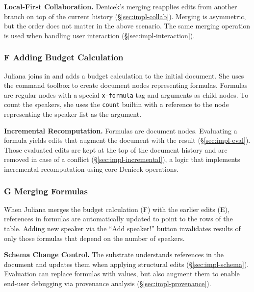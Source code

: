 \documentclass[sigconf]{acmart}
\newcommand{\diff}[1]{{#1}}
\newcommand{\note}[1]{}
\newcommand*\circled[1]
{{\normalfont \Large \textcircled{\footnotesize {#1}}}}
\DeclareRobustCommand{\keyideabox}[3]
{\vspace{\dimexpr\baselineskip\relax} \colorbox{gray!20}{
\parbox{\dimexpr\columnwidth-\marginparsep-10pt\relax}
{\small {#1} \textbf{#2.} #3}
}}
\begin{document}
\keyideabox{\faLightbulbO}{Local-First Collaboration}{Denicek's merging
reapplies edits from another branch on top of the current history (\S\ref{sec:impl-collab}).
Merging is asymmetric, but the order does not matter in the above scenario. The same merging
operation is used when handling user interaction (\S\ref{sec:impl-interaction}).}

\subsubsection*{\circled{F} Adding Budget Calculation} Juliana joins in and adds a budget calculation to
the initial document. \diff{She uses the command toolbox to create document nodes representing
formulas. Formulas are regular nodes with a special} {\small\texttt{x-formula}} \diff{tag and
arguments as child nodes. To count the speakers, she uses the} {\small\texttt{count}} \diff{builtin
with a reference to the node representing the speaker list as the argument.}\note{Modified to describe
representation of formulas.}

\keyideabox{\faLightbulbO}{Incremental Recomputation}{Formulas are document nodes.
Evaluating a formula yields edits that augment the document with the result
(\S\ref{sec:impl-eval}). Those evaluated edits are kept at the top of the document history and are
removed in case of a conflict (\S\ref{sec:impl-incremental}), a logic that implements
incremental recomputation using core Denicek operations.}

\subsubsection*{\circled{G} Merging Formulas} When Juliana merges the budget calculation (F) with
the earlier edits (E), references in formulas are automatically updated to point to the \diff{rows of the table}.
Adding new speaker via the ``Add speaker!'' button \diff{invalidates results of only those formulas
that depend on the number of speakers.}

\keyideabox{\faLightbulbO}{Schema Change Control}{The substrate understands references in
the document and updates them when applying structural edits (\S\ref{sec:impl-schema}).
Evaluation can replace formulas with values, but also augment them to enable
end-user debugging via provenance analysis (\S\ref{sec:impl-provenance}).}

\end{document}
